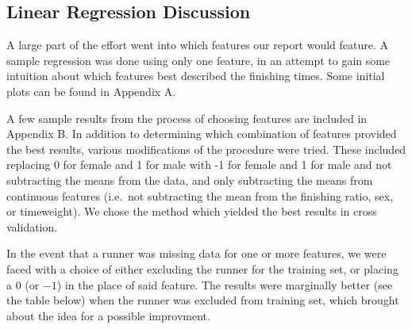 \documentclass{article}
\begin{document}
\subsection*{Linear Regression Discussion}

A large part of the effort went into which features our report would feature. A sample regression was done using only
one feature, in an attempt to gain some intuition about which features best described the finishing times.
Some initial plots can be found in Appendix A.

A few sample results from the process of choosing features are included in Appendix B.
In addition to determining which combination of features provided the best results, various modifications of
the procedure were tried. These included replacing 0 for female and 1 for male with -1 for female and 1 for male and not
subtracting the means from the data, and only subtracting the means from continuous features (i.e.\ not subtracting 
the mean from the finishing ratio, sex, or timeweight). 
We chose the method which yielded the best results in cross validation. 

In the event that a runner was missing data for one or more features, we were faced with a choice of either excluding the
runner for the training set, or placing a $0$ (or $-1$) in the place of said feature. The results were marginally better (see the table below) when 
the runner was excluded from training set, which brought about the idea for a possible improvment.
\end{document}

